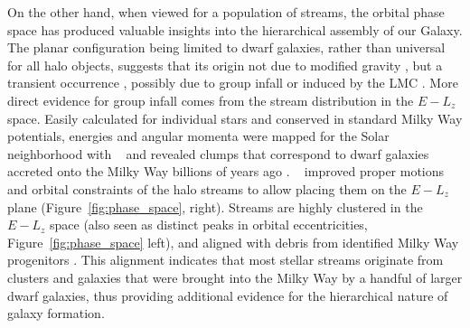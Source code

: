 \documentclass[final,5p,times,twocolumn,authoryear]{elsarticle}
\begin{document}
On the other hand, when viewed for a population of streams, the orbital phase space has produced valuable insights into the hierarchical assembly of our Galaxy.
The planar configuration being limited to dwarf galaxies, rather than universal for all halo objects, suggests that its origin  not  due to modified gravity \citep[e.g.,][]{pawlowski:2018}, but  a transient occurrence \citep{sawala:2023, xu:2023}, possibly due to group infall \citep{patel:2020} or induced by the LMC \citep{garavito-camargo:2021,garavito-camargo:2024}.
More direct evidence for group infall comes from the stream distribution in the $E-L_z$ space.
Easily calculated for individual stars and conserved in standard Milky Way potentials, energies and angular momenta were mapped for the Solar neighborhood with \gaia~ and revealed clumps that correspond to dwarf galaxies accreted onto the Milky Way billions of years ago \citep[e.g.,][]{helmi:2018,belokurov:2018,myeong:2019}.
\gaia~ improved proper motions and orbital constraints of the halo streams to allow placing them on the $E-L_z$ plane (Figure~\ref{fig:phase_space}, right).
Streams are highly clustered in the $E-L_z$ space (also seen as distinct peaks in orbital eccentricities, Figure~\ref{fig:phase_space} left), and aligned with debris from identified Milky Way progenitors \citep{bonaca:2021,malhan:2022}.
This alignment indicates that most stellar streams originate from clusters and galaxies that were brought into the Milky Way by a handful of larger dwarf galaxies, thus providing additional evidence for the hierarchical nature of galaxy formation.
\end{document}
